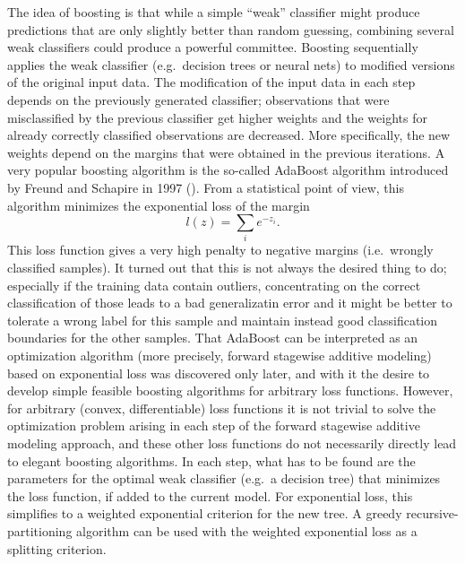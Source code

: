 The idea of boosting is that while a simple ``weak'' classifier might produce predictions that are only slightly better than random guessing, combining several weak classifiers could produce a powerful committee. 
Boosting sequentially applies the weak classifier (e.g.\ decision trees or neural nets) to modified versions of the original input data. 
The modification of the input data in each step depends on the previously generated classifier; observations that were misclassified by the previous classifier get higher weights and the weights for already correctly classified observations are decreased. More specifically, the new weights depend on the margins that were obtained in the previous iterations. 
A very popular boosting algorithm is the so-called AdaBoost algorithm introduced by Freund and Schapire in 1997 (\cite{freund1997decision}). 
From a statistical point of view, this algorithm minimizes the exponential loss of the margin
$$l(z) = \sum_i e^{-z_i}.$$
This loss function gives a very high penalty to negative margins (i.e.\ wrongly classified samples). 
It turned out that this is not always the desired thing to do; especially if the training data contain outliers, concentrating on the correct classification of those leads to a bad generalizatin error and it might be better to tolerate a wrong label for this sample and maintain instead good classification boundaries for the other samples. 
That AdaBoost can be interpreted as an optimization algorithm (more precisely, forward stagewise additive modeling) based on exponential loss was discovered only later, and with it the desire to develop simple feasible boosting algorithms for arbitrary loss functions. 
However, for arbitrary (convex, differentiable) loss functions it is not trivial to solve the optimization problem arising in each step of the forward stagewise additive modeling approach, and these other loss functions do not necessarily directly lead to elegant boosting algorithms. 
In each step, what has to be found are the parameters for the optimal weak classifier (e.g.\ a decision tree) that minimizes the loss function, if added to the current model. 
For exponential loss, this simplifies to a weighted exponential criterion for the new tree. A greedy recursive-partitioning algorithm can be used with the weighted exponential loss as a splitting criterion. 

